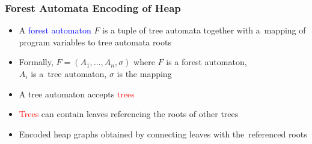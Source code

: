 \documentclass{beamer}
\newenvironment{figure*}%
{\begin{figure}}
{\end{figure}}
\newcommand{\hlbl}[1]{\textcolor{blue}{#1}}
\newcommand{\hlgr}[1]{\textcolor{olive!50!green}{#1}}
\newcommand{\hlrd}[1]{\textcolor{red}{#1}}
\newcommand{\hlye}[1]{\textcolor{magenta}{#1}}
\begin{document}
\begin{frame}
\frametitle{Forest Automata Encoding of Heap}

	\begin{itemize}
			\item A \hlbl{forest automaton} $F$ is a tuple of \hlgr{tree automata}
				together with a~mapping of program variables to tree automata roots
		    \item Formally, $F = (A_1,\ldots,A_n, \sigma)$ where $F$ is a forest automaton,\\
				$A_i$ is a~tree automaton,
				$\sigma$ is the mapping
			\item A \hlgr{tree automaton} accepts \hlrd{trees}
			\item \hlrd{Trees} can contain leaves referencing the roots of other trees
			\item Encoded heap graphs obtained by connecting leaves with the~referenced roots
	\end{itemize}

	\begin{center}
	\begin{figure}
		\begin{subfigure}{0.5\textwidth}
			\centering
			
		\end{subfigure}%
		\hspace{-0.3cm}
		\begin{subfigure}{0.5\textwidth}
			\centering
			
		\end{subfigure}
	\end{figure}
	\end{center}

\end{frame}

\end{document}

